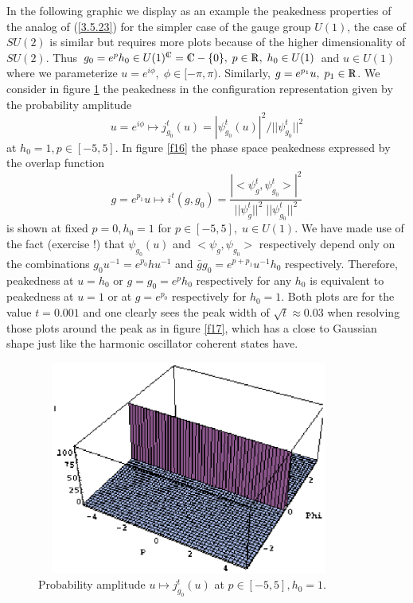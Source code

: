 \documentclass[12pt]{report}
\def\be{\begin{equation}}
\def\ee{\end{equation}}
\def\Rl{{\mathchoice
{\setbox0=\hbox{$\displaystyle\rm R$}\hbox{\hbox to0pt
{\kern0.4\wd0\vrule height0.9\ht0\hss}\box0}}
{\setbox0=\hbox{$\textstyle\rm R$}\hbox{\hbox to0pt
{\kern0.4\wd0\vrule height0.9\ht0\hss}\box0}}
{\setbox0=\hbox{$\scriptstyle\rm R$}\hbox{\hbox to0pt
{\kern0.4\wd0\vrule height0.9\ht0\hss}\box0}}
{\setbox0=\hbox{$\scriptscriptstyle\rm R$}\hbox{\hbox to0pt
{\kern0.4\wd0\vrule height0.9\ht0\hss}\box0}}}}
\def\Cl{{\mathchoice
{\setbox0=\hbox{$\displaystyle\rm C$}\hbox{\hbox to0pt
{\kern0.4\wd0\vrule height0.9\ht0\hss}\box0}}
{\setbox0=\hbox{$\textstyle\rm C$}\hbox{\hbox to0pt
{\kern0.4\wd0\vrule height0.9\ht0\hss}\box0}}
{\setbox0=\hbox{$\scriptstyle\rm C$}\hbox{\hbox to0pt
{\kern0.4\wd0\vrule height0.9\ht0\hss}\box0}}
{\setbox0=\hbox{$\scriptscriptstyle\rm C$}\hbox{\hbox to0pt
{\kern0.4\wd0\vrule height0.9\ht0\hss}\box0}}}}
\begin{document}
In the following graphic
we display as an example the peakedness properties of 
the analog of (\ref{3.5.23}) for the simpler case of the gauge 
group $U(1)$, the case of $SU(2)$ is similar but requires more plots 
because of the higher dimensionality of $SU(2)$. 
Thus $g_0=e^p h_0\in U(1)^\Cl=\Cl-\{0\},\;p\in\Rl,\;h_0\in U(1)$ and 
$u\in U(1)$ where we parameterize $u=e^{i\phi},\;\phi\in [-\pi,\pi)$.
Similarly, $g=e^{p_1} u,\;p_1\in\Rl$.
We consider in figure \ref{f15} the peakedness in the configuration 
representation given by the probability amplitude 
\be \label{3.5.24}
u=e^{i\phi}\mapsto j^t_{g_0}(u)=|\psi^t_{g_0}(u)|^2/||\psi^t_{g_0}||^2
\ee 
at $h_0=1, p\in [-5,5]$. 
In figure \ref{f16} the phase space peakedness expressed by the 
overlap function 
\be \label{3.5.25}
g=e^{p_1} u\mapsto i^t(g,g_0)
=\frac{|<\psi^t_g,\psi^t_{g_0}>|^2}{||\psi^t_g||^2\; ||\psi^t_{g_0}||^2}  
\ee
is shown at fixed $p=0,h_0=1$ for $p\in [-5,5],\;u\in U(1)$. We have 
made use of the fact (exercise !)
that $\psi_{g_0}(u)$ and $<\psi_g,\psi_{g_0}>$ respectively depend 
only on the combinations $g_0 u^{-1}=
e^{p_0} hu^{-1}$ and $\bar{g}g_0 =e^{p+p_1} u^{-1} h_0$ respectively.
Therefore, peakedness at $u=h_0$ or $g=g_0=e^p h_0$ respectively for any 
$h_0$ is 
equivalent to peakedness at $u=1$ or at $g=e^{p_0}$ respectively for 
$h_0=1$. Both plots are for the 
value $t=0.001$ and one clearly sees the peak width of 
$\sqrt{t}\approx 0.03$ when resolving those plots around the 
peak as in figure \ref{f17}, which has a close to Gaussian shape just like 
the harmonic oscillator coherent states have.
%
\begin{figure}
\includegraphics[width=10cm,height=7cm]{proc9fig15.ps}
\caption{Probability amplitude $u\mapsto j^t_{g_0}(u)$ at 
$p\in[-5,5], h_0=1$.}
\label{f15}
\end{figure}
%
\end{document}
